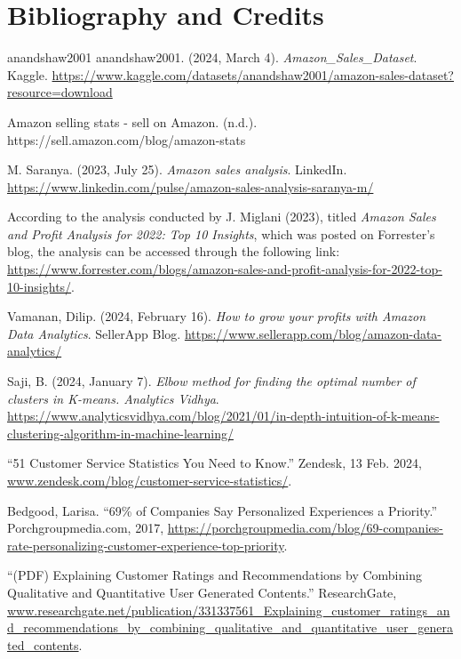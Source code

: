 \documentclass[11pt]{article} %
\begin{document}
\section{Bibliography and Credits}
\begin{thebibliography}{5}

    {anandshaw2001}
    anandshaw2001. (2024, March 4). \textit{Amazon\_Sales\_Dataset}. Kaggle. \url{https://www.kaggle.com/datasets/anandshaw2001/amazon-sales-dataset?resource=download}
    
    Amazon selling stats - sell on Amazon. (n.d.). https://sell.amazon.com/blog/amazon-stats 
    
    M. Saranya. (2023, July 25). \textit{Amazon sales analysis}. LinkedIn. \url{https://www.linkedin.com/pulse/amazon-sales-analysis-saranya-m/}
    
    
    According to the analysis conducted by J. Miglani (2023), titled \textit{Amazon Sales and Profit Analysis for 2022: Top 10 Insights}, which was posted on Forrester's blog, the analysis can be accessed through the following link: \url{https://www.forrester.com/blogs/amazon-sales-and-profit-analysis-for-2022-top-10-insights/}.
    
    
    Vamanan, Dilip. (2024, February 16). \textit{How to grow your profits with Amazon Data Analytics}. SellerApp Blog. \url{https://www.sellerapp.com/blog/amazon-data-analytics/}

    Saji, B. (2024, January 7). \textit{Elbow method for finding the optimal number of clusters in K-means. Analytics Vidhya}. \url{
    https://www.analyticsvidhya.com/blog/2021/01/in-depth-intuition-of-k-means-clustering-algorithm-in-machine-learning/}

    “51 Customer Service Statistics You Need to Know.” Zendesk, 13 Feb. 2024, \url{www.zendesk.com/blog/customer-service-statistics/}.

    Bedgood, Larisa. “69\% of Companies Say Personalized Experiences a Priority.” Porchgroupmedia.com, 2017, \url{https://porchgroupmedia.com/blog/69-companies-rate-personalizing-customer-experience-top-priority}.

    “(PDF) Explaining Customer Ratings and Recommendations by Combining Qualitative and Quantitative User Generated Contents.” ResearchGate, \url{www.researchgate.net/publication/331337561_Explaining_customer_ratings_and_recommendations_by_combining_qualitative_and_quantitative_user_generated_contents}.


\end{thebibliography}
\end{document}
